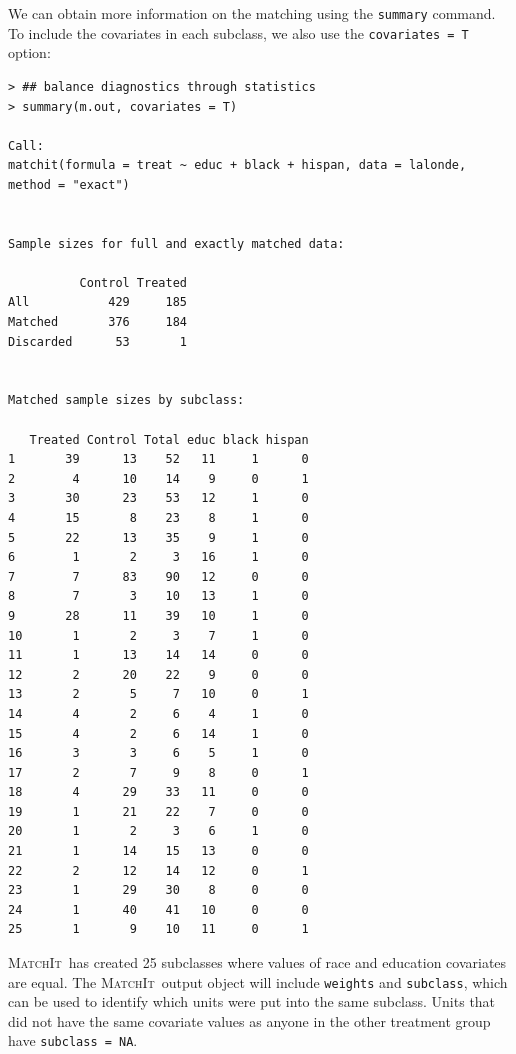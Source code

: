 \documentclass[oneside,letterpaper,titlepage]{article}
\newcommand{\MatchIt}{\textsc{MatchIt}}
\begin{document}
We can obtain more information on the matching using the {\tt summary}
command.  To include the covariates in each subclass, we also use the
\texttt{covariates = T} option:
\begin{verbatim}
> ## balance diagnostics through statistics
> summary(m.out, covariates = T)

Call:
matchit(formula = treat ~ educ + black + hispan, data = lalonde, method = "exact")


Sample sizes for full and exactly matched data:

          Control Treated
All           429     185
Matched       376     184
Discarded      53       1


Matched sample sizes by subclass:

   Treated Control Total educ black hispan
1       39      13    52   11     1      0
2        4      10    14    9     0      1
3       30      23    53   12     1      0
4       15       8    23    8     1      0
5       22      13    35    9     1      0
6        1       2     3   16     1      0
7        7      83    90   12     0      0
8        7       3    10   13     1      0
9       28      11    39   10     1      0
10       1       2     3    7     1      0
11       1      13    14   14     0      0
12       2      20    22    9     0      0
13       2       5     7   10     0      1
14       4       2     6    4     1      0
15       4       2     6   14     1      0
16       3       3     6    5     1      0
17       2       7     9    8     0      1
18       4      29    33   11     0      0
19       1      21    22    7     0      0
20       1       2     3    6     1      0
21       1      14    15   13     0      0
22       2      12    14   12     0      1
23       1      29    30    8     0      0
24       1      40    41   10     0      0
25       1       9    10   11     0      1
\end{verbatim}
\MatchIt\ has created 25 subclasses where values of race and education
covariates are equal.  The \MatchIt\ output object will include
\texttt{weights} and \texttt{subclass}, which can be used to identify
which units were put into the same subclass.  Units that did not have
the same covariate values as anyone in the other treatment group have
\texttt{subclass = NA}.
\end{document}
